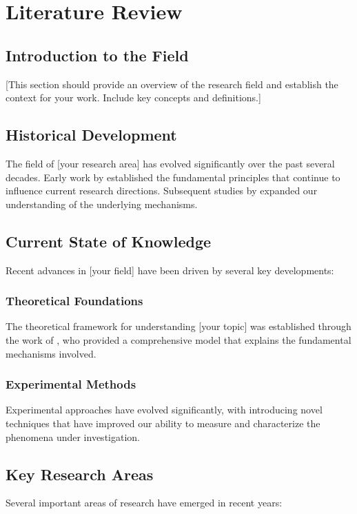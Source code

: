 \chapter{Literature Review}

\section{Introduction to the Field}
[This section should provide an overview of the research field and establish the context for your work. Include key concepts and definitions.]

\section{Historical Development}
The field of [your research area] has evolved significantly over the past several decades. Early work by \textcite{smith2020fundamentals} established the fundamental principles that continue to influence current research directions. Subsequent studies by \textcite{brown2019advances} expanded our understanding of the underlying mechanisms.

\section{Current State of Knowledge}
Recent advances in [your field] have been driven by several key developments:

\subsection{Theoretical Foundations}
The theoretical framework for understanding [your topic] was established through the work of \textcite{wilson2021theoretical}, who provided a comprehensive model that explains the fundamental mechanisms involved.

\subsection{Experimental Methods}
Experimental approaches have evolved significantly, with \textcite{anderson2022experimental} introducing novel techniques that have improved our ability to measure and characterize the phenomena under investigation.

\section{Key Research Areas}
Several important areas of research have emerged in recent years:


